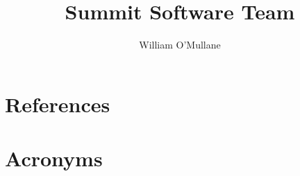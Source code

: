\documentclass[OPS,authoryear,toc]{lsstdoc}
\title{Summit Software Team}
\author{%
William O'Mullane
}
\date{\vcsDate}
\begin{document}
\mkshorttitle




\appendix
\section{References} \label{sec:bib}
\renewcommand{\refname}{} %


\section{Acronyms} \label{sec:acronyms}
%
\printglossaries
\end{document}
